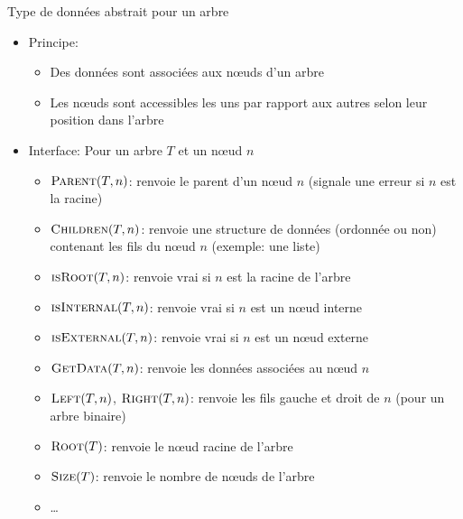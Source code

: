 \begin{frame}{Type de données abstrait pour un arbre}
\begin{itemize}
\item Principe:
\begin{itemize}
\item Des données sont associées aux n\oe uds d'un arbre
\item Les n\oe uds sont accessibles les uns par rapport aux autres selon leur position dans l'arbre
\end{itemize}
\item Interface: Pour un arbre $T$ et un n\oe ud $n$
\begin{itemize}
\item $\textnormal{\scshape Parent}(T,n)$: renvoie le parent d'un n\oe ud $n$ (signale une erreur si $n$ est la racine)
\item $\textnormal{\scshape Children}(T,n)$: renvoie une structure de données (ordonnée
  ou non) contenant les fils du n\oe ud $n$ (exemple: une liste)
\item $\textnormal{\scshape isRoot}(T,n)$: renvoie vrai si $n$ est la racine de l'arbre
\item $\textnormal{\scshape isInternal}(T,n)$: renvoie vrai si $n$ est un n\oe ud interne
\item $\textnormal{\scshape isExternal}(T,n)$: renvoie vrai si $n$ est un n\oe ud externe
\item $\textnormal{\scshape GetData}(T,n)$: renvoie les données associées au n\oe ud $n$
\item $\textnormal{\scshape Left}(T,n)$, $\textnormal{\scshape Right}(T,n)$: renvoie les fils gauche et droit de $n$ (pour un arbre binaire)
\item $\textnormal{\scshape Root}(T)$: renvoie le n\oe ud racine de l'arbre
\item $\textnormal{\scshape Size}(T)$: renvoie le nombre de n\oe uds de l'arbre
\item \ldots
\end{itemize}
\end{itemize}
\end{frame}

